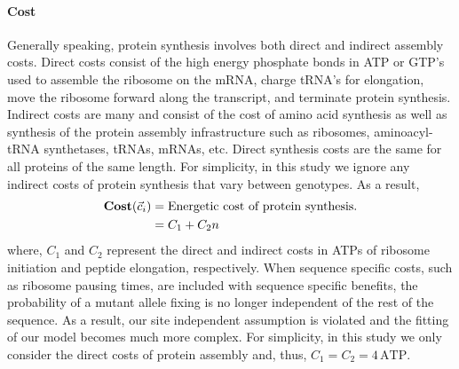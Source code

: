 \documentclass{article}
\newcommand{\Costcveci}{\ensuremath{\Cost(\cveci)}\xspace}
\newcommand{\Cost}{\ensuremath{\text{\textbf{Cost}}}\xspace}
\newcommand{\cveci}{\ensuremath{\cvec_i}\xspace}
\newcommand{\cvec}{\ensuremath{\Vec{c}}\xspace}
\begin{document}
\begin{itemize}
\paragraph*{Cost}
Generally speaking, protein synthesis involves both direct and indirect assembly costs.
Direct costs consist of the high energy phosphate bonds in ATP or GTP's used to assemble the ribosome on the mRNA, charge tRNA's for elongation, move the ribosome forward along the transcript, and terminate protein synthesis.
Indirect costs are many and consist of the cost of amino acid synthesis as well as synthesis of the protein assembly infrastructure such as ribosomes, aminoacyl-tRNA synthetases, tRNAs, mRNAs, etc.
Direct synthesis costs are the same for all proteins of the same length.
For simplicity, in this study we ignore any indirect costs of protein synthesis that vary between genotypes.
As a result, 
\begin{align}
\label{eq:defineCost}
  \Costcveci  &= \text{Energetic cost of protein synthesis.}\\
  &= C_1 + C_2 n
\end{align}
where, $C_1$ and $C_2$ represent the direct and indirect costs in ATPs of ribosome initiation and peptide elongation, respectively.
When sequence specific costs, such as ribosome pausing times, are included with sequence specific benefits, the probability of a mutant allele fixing is no longer independent of the rest of the sequence.
As a result, our site independent assumption is violated and the fitting of our model becomes much more complex.
For simplicity, in this study we only consider the direct costs of protein assembly and, thus, $C_1 = C_2 = 4  \,\text{ATP}$.
 



\end{itemize}
\end{document}
